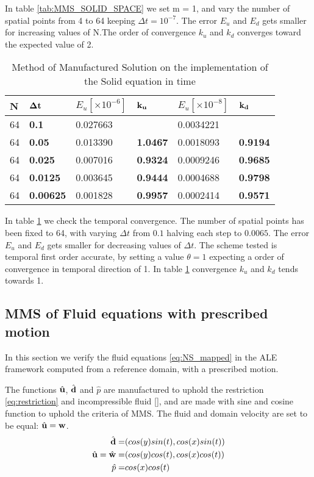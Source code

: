 In table \ref{tab:MMS_SOLID_SPACE} we set m = 1, and vary the number of spatial points from 4 to 64 keeping $\Delta t = 10^{-7}$. The error $E_u$ and $E_d$ gets smaller for increasing values of N.The order of convergence $k_u$ and $k_d$ converges toward the expected value of 2.

\begin{table}[H]
\centering
\caption{Method of Manufactured Solution on the implementation of the Solid equation in time}
\label{tab:MMS_SOLID_TIME}
\begin{tabular}{|l|l|l|l|l|l|}
\hline
N & $\bold{\Delta t}$ & $E_u [\times10^{-6}]$ & $\bold{k_u}$ & $E_u [\times10^{-8}]$ & $\bold{k_d}$ \\ \hline
64 & \textbf{0.1} & 0.027663 & \textbf{} & 0.0034221 & \textbf{} \\ \hline
64 & \textbf{0.05} & 0.013390 & \textbf{1.0467} & 0.0018093 & \textbf{0.9194} \\ \hline
64 & \textbf{0.025} & 0.007016 & \textbf{0.9324} & 0.0009246 & \textbf{0.9685} \\ \hline
64 & \textbf{0.0125} & 0.003645 & \textbf{0.9444} & 0.0004688 & \textbf{0.9798} \\ \hline
64 & \textbf{0.00625} & 0.001828 & \textbf{0.9957} & 0.0002414 & \textbf{0.9571} \\ \hline
\end{tabular}
\end{table}

In table \ref{tab:MMS_SOLID_TIME} we check the temporal convergence. The number of spatial points has been fixed to 64, with varying $\Delta t $ from $0.1$ halving each step to $0.0065$. The error $E_u$ and $E_d$ gets smaller for decreasing values of $\Delta t$. The scheme tested is temporal first order accurate, by setting a value $\theta = 1$ expecting a order of convergence in temporal direction of 1. In table \ref{tab:MMS_SOLID_TIME} convergence $k_u$ and $k_d$ tends towards 1.

\subsection{MMS of Fluid equations with prescribed motion}
In this section we verify the fluid equations \eqref{eq:NS_mapped} in the ALE framework computed from a reference domain, with a prescribed motion.

The functions $\hat{\bold{u}}$, $\hat{\bold{d}}$ and $\hat{p}$ are manufactured to uphold the restriction \eqref{eq:restriction} and incompressible fluid \eqref{}, and are made with sine and cosine function to uphold the criteria of MMS. The fluid and domain velocity are set to be equal: $\hat{\bold{u}} = \bold{w}$. 
\begin{align*}
\hat{\bold{d}} =& ( cos(y)sin(t) , cos(x)sin(t) )\\
\hat{\bold{u}} = \hat{\bold{w}}=& ( cos(y)cos(t), cos(x)cos(t) ) \\
\hat{p} =& cos(x)cos(t)
\end{align*}


